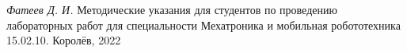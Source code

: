 \begin{thebibliography}{2}
	\emph{Фатеев Д. И.} Методические указания для студентов по проведению лабораторных работ для специальности Мехатроника и мобильная робототехника 15.02.10. Королёв, 2022
\end{thebibliography}